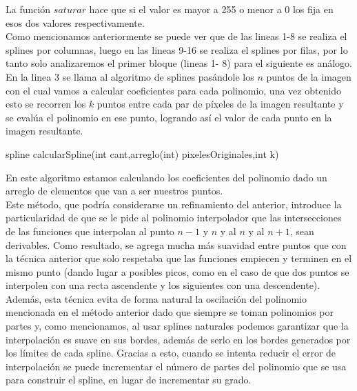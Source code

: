 La función $saturar$ hace que si el valor es mayor a 255 o menor a 0 los fija en esos dos valores respectivamente.\\
Como mencionamos anteriormente se puede ver que de las lineas 1-8 se realiza el splines por columnas, luego en las lineas 9-16 se realiza el splines por filas, por lo tanto solo analizaremos el primer bloque (lineas 1- 8) para el siguiente es análogo.\\
En la linea 3 se llama al algoritmo de splines pasándole los $n$ puntos de la imagen con el cual vamos a calcular coeficientes para cada polinomio, una vez obtenido esto se recorren los $k$ puntos entre cada par de píxeles de la imagen resultante y se evalúa el polinomio en ese punto, logrando así el valor de cada punto en la imagen resultante. 
\begin{algorithm}[H]
\begin{algorithmic}[1]\parskip=1mm
\caption{spline calcularSpline(int cant,arreglo(int) pixelesOriginales,int k)}
  \STATE{\quad$ (cs_{i} + 1] - cs[i]) / (3 * k)$}
\end{algorithmic}
\end{algorithm}

En este algoritmo \cite{burden} estamos calculando los coeficientes del polinomio dado un arreglo de elementos que van a ser nuestros puntos.\\

Este método, que podría considerarse un refinamiento del anterior, introduce la particularidad de que se le pide al polinomio interpolador que las intersecciones de las funciones que interpolan al punto $n-1$ y $n$ y al $n$ y al $n+1$, sean derivables. Como resultado, se agrega mucha más suavidad entre puntos que con la técnica anterior que solo respetaba que las funciones empiecen y terminen en el mismo punto (dando lugar a posibles picos, como en el caso de que dos puntos se interpolen con una recta ascendente y los siguientes con una descendente). Además, esta técnica evita de forma natural la oscilación del polinomio mencionada en el método anterior dado que siempre se toman polinomios por partes y, como mencionamos, al usar splines naturales podemos garantizar que la interpolación es suave en sus bordes, además de serlo en los bordes generados por los límites de cada spline. Gracias a esto, cuando se intenta reducir el error de interpolación se puede incrementar el número de partes del polinomio que se usa para construir el spline, en lugar de incrementar su grado.
